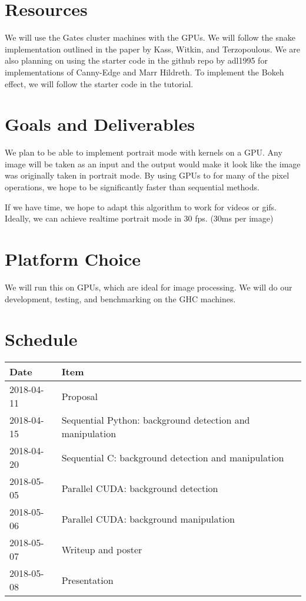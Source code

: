 \documentclass[12pt]{article}
\begin{document}
\section{Resources}

We will use the Gates cluster machines with the GPUs. We will follow the snake
implementation outlined in the paper by Kass, Witkin, and Terzopoulous.
\cite{paper} We are also planning on using the starter code in the github repo
by adl1995 for implementations of Canny-Edge and Marr Hildreth. \cite{edge} To
implement the Bokeh effect, we will follow the starter code in the tutorial.
\cite{bokeh}

\section{Goals and Deliverables}

We plan to be able to implement portrait mode with kernels on a GPU. Any image
will be taken as an input and the output would make it look like the image was
originally taken in portrait mode. By using GPUs to for many of the pixel
operations, we hope to be significantly faster than sequential methods.

If we have time, we hope to adapt this algorithm to work for videos or gifs.
Ideally, we can achieve realtime portrait mode in 30 fps. (30ms per image)

\section{Platform Choice}

We will run this on GPUs, which are ideal for image processing. We will do our
development, testing, and benchmarking on the GHC machines.

\section{Schedule}

\begin{tabular}{l|l}
    Date & Item \\
    \hline
    2018-04-11 & Proposal \\
    2018-04-15 & Sequential Python: background detection and manipulation \\
    2018-04-20 & Sequential C: background detection and manipulation \\
    2018-05-05 & Parallel CUDA: background detection \\
    2018-05-06 & Parallel CUDA: background manipulation \\
    2018-05-07 & Writeup and poster \\
    2018-05-08 & Presentation
\end{tabular}

\end{document}
